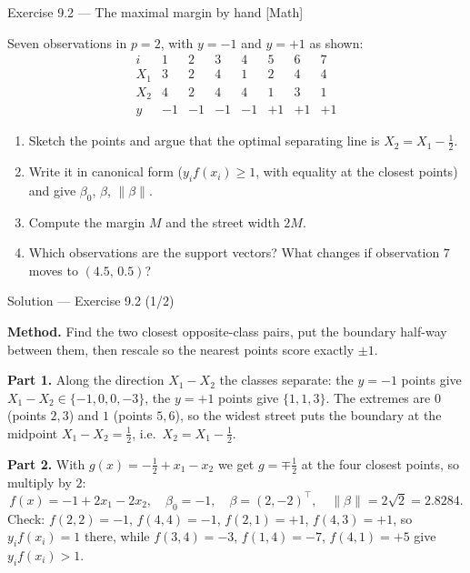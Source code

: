 \documentclass[aspectratio=169,11pt]{beamer}
\begin{document}
\begin{frame}{Exercise 9.2 --- The maximal margin by hand [Math]}
\begin{exercise}
  Seven observations in $p=2$, with $y=-1$ and $y=+1$ as shown:
  \[
    \begin{array}{c|ccccccc}
      i & 1 & 2 & 3 & 4 & 5 & 6 & 7\\ \hline
      X_1 & 3 & 2 & 4 & 1 & 2 & 4 & 4\\
      X_2 & 4 & 2 & 4 & 4 & 1 & 3 & 1\\
      y   & -1& -1& -1& -1& +1& +1& +1
    \end{array}
  \]
  \begin{enumerate}
    \item Sketch the points and argue that the optimal separating line is
          $X_2 = X_1 - \tfrac12$.
    \item Write it in canonical form ($y_i f(x_i)\ge 1$, with equality at the
          closest points) and give $\beta_0$, $\beta$, $\|\beta\|$.
    \item Compute the margin $M$ and the street width $2M$.
    \item Which observations are the support vectors? What changes if
          observation $7$ moves to $(4.5,\,0.5)$?
  \end{enumerate}
\end{exercise}
\end{frame}

\begin{frame}{Solution --- Exercise 9.2 (1/2)}
\begin{solutionbox}
  \textbf{Method.} Find the two closest opposite-class pairs, put the boundary
  half-way between them, then rescale so the nearest points score exactly
  $\pm1$.

  \textbf{Part 1.} Along the direction $X_1-X_2$ the classes separate: the
  $y=-1$ points give $X_1-X_2 \in \{-1,0,0,-3\}$, the $y=+1$ points give
  $\{1,1,3\}$. The extremes are $0$ (points $2,3$) and $1$ (points $5,6$), so
  the widest street puts the boundary at the midpoint $X_1-X_2=\tfrac12$,
  i.e.\ $X_2=X_1-\tfrac12$.

  \textbf{Part 2.} With $g(x)= -\tfrac12 + x_1 - x_2$ we get
  $g=\mp\tfrac12$ at the four closest points, so multiply by $2$:
  \[
    f(x) = -1 + 2x_1 - 2x_2,
    \quad \beta_0=-1,\quad \beta=(2,-2)^\top,\quad
    \|\beta\|=2\sqrt2 = 2.8284 .
  \]
  Check: $f(2,2)=-1$, $f(4,4)=-1$, $f(2,1)=+1$, $f(4,3)=+1$, so
  $y_if(x_i)=1$ there, while $f(3,4)=-3$, $f(1,4)=-7$, $f(4,1)=+5$ give
  $y_if(x_i)>1$.
\end{solutionbox}
\end{frame}
\end{document}
